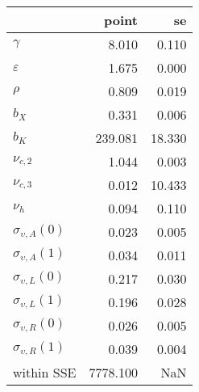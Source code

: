 \begin{tabular}{lrr}
\toprule
{} &     point &      se \\
\midrule
$\gamma$                 &     8.010 &   0.110 \\
$\varepsilon$            &     1.675 &   0.000 \\
$\rho$                   &     0.809 &   0.019 \\
$b_X$                    &     0.331 &   0.006 \\
$b_K$                    &   239.081 &  18.330 \\
$\nu_{c,2}$              &     1.044 &   0.003 \\
$\nu_{c,3}$              &     0.012 &  10.433 \\
$\nu_{h}$                &     0.094 &   0.110 \\
$\sigma_{\upsilon,A}(0)$ &     0.023 &   0.005 \\
$\sigma_{\upsilon,A}(1)$ &     0.034 &   0.011 \\
$\sigma_{\upsilon,L}(0)$ &     0.217 &   0.030 \\
$\sigma_{\upsilon,L}(1)$ &     0.196 &   0.028 \\
$\sigma_{\upsilon,R}(0)$ &     0.026 &   0.005 \\
$\sigma_{\upsilon,R}(1)$ &     0.039 &   0.004 \\
within SSE               &  7778.100 &     NaN \\
\bottomrule
\end{tabular}
